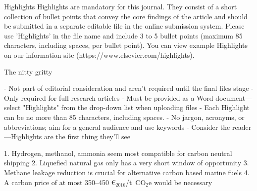 Highlights
Highlights are mandatory for this journal. They consist of a short collection of bullet points that convey the core findings of the article and should be submitted in a separate editable file in the online submission system. Please use 'Highlights' in the file name and include 3 to 5 bullet points (maximum 85 characters, including spaces, per bullet point). You can view example Highlights on our information site (https://www.elsevier.com/highlights).

The nitty gritty

- Not part of editorial consideration and aren't required until the final files stage
- Only required for full research articles
- Must be provided as a Word document— select "Highlights" from the drop-down list when uploading files
- Each Highlight can be no more than 85 characters, including spaces.
- No jargon, acronyms, or abbreviations; aim for a general audience and use keywords
- Consider the reader—Highlights are the first thing they'll see

1. Hydrogen, methanol, ammonia seem most compatible for carbon neutral shipping
2. Liquefied natural gas only has a very short window of opportunity
3. Methane leakage reduction is crucial for alternative carbon based marine fuels
4. A carbon price of at most 350--450 \euro$_{2016}$/t~CO$_2$e would be necessary